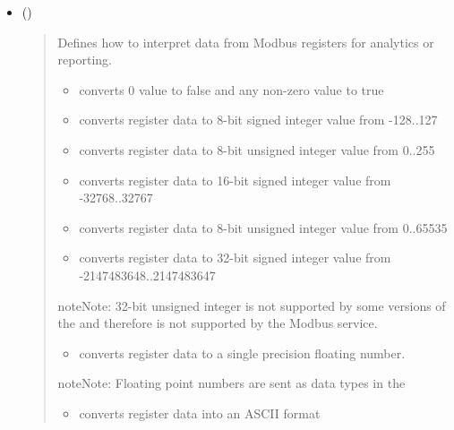 \documentclass[letterpaper,10pt,english]{sphinxmanual}
\begin{document}
\begin{itemize}
\item {} 
 ()
\begin{quote}

Defines how to interpret data from Modbus registers for analytics or reporting.
\begin{itemize}
\item {} 
 converts 0 value to false and any non-zero value to true

\item {} 
 converts register data to 8-bit signed integer value from -128..127

\item {} 
 converts register data to 8-bit unsigned integer value from 0..255

\item {} 
 converts register data to 16-bit signed integer value from -32768..32767

\item {} 
 converts register data to 8-bit unsigned integer value from 0..65535

\item {} 
 converts register data to 32-bit signed integer value from -2147483648..2147483647

\end{itemize}

\begin{sphinxadmonition}{note}{Note:}
32-bit unsigned integer is not supported by some versions of the  and therefore is not supported by the Modbus service.
\end{sphinxadmonition}
\begin{itemize}
\item {} 
 converts register data to a single precision floating number.

\end{itemize}

\begin{sphinxadmonition}{note}{Note:}
Floating point numbers are sent as  data types in the 
\end{sphinxadmonition}
\begin{itemize}
\item {} 
 converts register data into an ASCII format


\end{itemize}
\end{quote}
\end{itemize}
\end{document}
